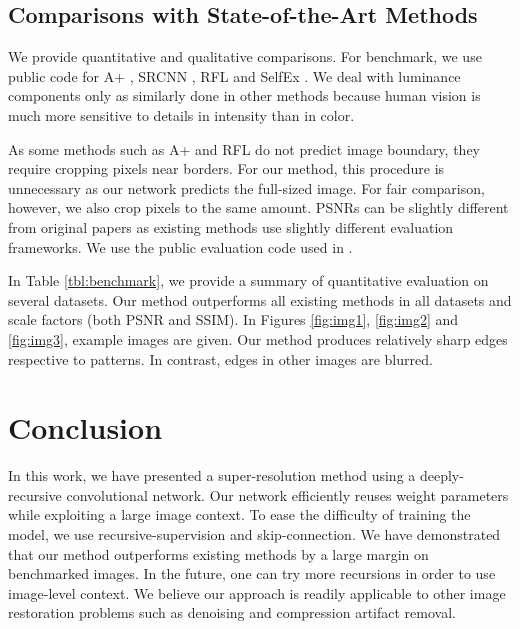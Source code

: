 \documentclass[10pt,twocolumn,letterpaper]{article}
\begin{document}
\subsection{Comparisons with State-of-the-Art Methods}
We provide quantitative and qualitative comparisons. For benchmark, we use public code for A+ \cite{Timofte}, SRCNN \cite{dong2014image}, RFL \cite{schulter2015fast} and  SelfEx \cite{Huang-CVPR-2015}. We deal with luminance components only as similarly done in other methods because human vision is much more sensitive to details in intensity than in color.

As  some methods such as A+ \cite{Timofte} and  RFL \cite{schulter2015fast} do not predict image boundary, they require cropping pixels near borders. For our method, this procedure is unnecessary as our network predicts the full-sized image. For fair comparison, however, we also crop pixels to the same amount. PSNRs can be slightly different from original papers as existing methods use slightly different evaluation frameworks. We use the public evaluation code used in \cite{Huang-CVPR-2015}.

In Table \ref{tbl:benchmark}, we provide a summary of quantitative evaluation on several datasets. 
Our method outperforms all existing methods in all datasets and scale factors (both PSNR and SSIM). In Figures \ref{fig:img1}, \ref{fig:img2} and \ref{fig:img3}, example images are given. Our method produces relatively sharp edges respective to patterns. In contrast, edges in other images are blurred.

\section{Conclusion}
In this work, we have presented a super-resolution method using a deeply-recursive convolutional network. Our network efficiently reuses weight parameters while exploiting a large image context. To ease the difficulty of training the model, we use recursive-supervision and skip-connection. We have demonstrated that our method outperforms existing methods by a large margin on benchmarked images. In the future, one can try more recursions in order to use image-level context. We believe our approach is readily applicable to other image restoration problems such as denoising and compression artifact removal.

{\small
	
	
}
\end{document}
